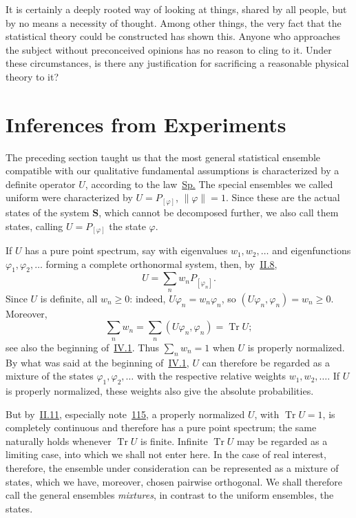 \documentclass[fontsize=13pt,twoside,openany,headings=normal,parskip=false,bookmarkpackage=false,DIV=calc]{scrbook}
\begin{document}
It is certainly a deeply rooted way of looking at things, shared by all people, but by no means a necessity of thought. Among other things, the very fact that the statistical theory could be constructed has shown this. Anyone who approaches the subject without preconceived opinions has no reason to cling to it. Under these circumstances, is there any justification for sacrificing a reasonable physical theory to it?

\section{Inferences from Experiments}\label{sec:IV.3}
The preceding section taught us that the most general statistical ensemble compatible with our qualitative fundamental assumptions is characterized by a definite operator $U$, according to the law~\hyperref[eq:IV.2.Sp]{Sp.} The special ensembles we called uniform were characterized by $U=P_{[\varphi]}$, $\|\varphi\|=1$. Since these are the actual states of the system $\boldsymbol{S}$, which cannot be decomposed further, we also call them states, calling $U=P_{[\varphi]}$ the state $\varphi$.

If $U$ has a pure point spectrum, say with eigenvalues $w_1,w_2,\ldots$ and eigenfunctions $\varphi_1,\varphi_2,\ldots$ forming a complete orthonormal system, then, by~\hyperref[sec:II.8]{II.8},
\[
U=\sum_n w_nP_{[\varphi_n]}.
\]
\hypertarget{origpage-174}{}%
Since $U$ is definite, all $w_n\geq0$: indeed, $U\varphi_n=w_n\varphi_n$, so $(U\varphi_n,\varphi_n)=w_n\geq0$. Moreover,
\[
\sum_nw_n=\sum_n(U\varphi_n,\varphi_n)=\operatorname{Tr}U;
\]
see also the beginning of~\hyperref[sec:IV.1]{IV.1}. Thus $\sum_nw_n=1$ when $U$ is properly normalized. By what was said at the beginning of~\hyperref[sec:IV.1]{IV.1}, $U$ can therefore be regarded as a mixture of the states $\varphi_1,\varphi_2,\ldots$ with the respective relative weights $w_1,w_2,\ldots$. If $U$ is properly normalized, these weights also give the absolute probabilities.

But by~\hyperref[sec:II.11]{II.11}, especially note~\hyperlink{note-115}{115}, a properly normalized $U$, with $\operatorname{Tr}U=1$, is completely continuous and therefore has a pure point spectrum; the same naturally holds whenever $\operatorname{Tr}U$ is finite. Infinite $\operatorname{Tr}U$ may be regarded as a limiting case, into which we shall not enter here. In the case of real interest, therefore, the ensemble under consideration can be represented as a mixture of states, which we have, moreover, chosen pairwise orthogonal. We shall therefore call the general ensembles \emph{mixtures}, in contrast to the uniform ensembles, the states.
\end{document}
